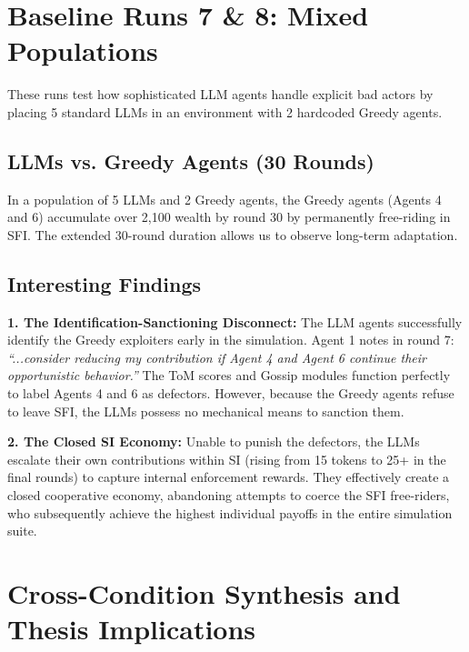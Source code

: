 \documentclass[11pt,a4paper]{article}
\begin{document}
\section{Baseline Runs 7 \& 8: Mixed Populations}

These runs test how sophisticated LLM agents handle explicit bad actors by placing 5 standard LLMs in an environment with 2 hardcoded Greedy agents.

\subsection{LLMs vs. Greedy Agents (30 Rounds)}
In a population of 5 LLMs and 2 Greedy agents, the Greedy agents (Agents 4 and 6) accumulate over 2,100 wealth by round 30 by permanently free-riding in SFI. The extended 30-round duration allows us to observe long-term adaptation.

\subsection{Interesting Findings}
\textbf{1. The Identification-Sanctioning Disconnect:}
The LLM agents successfully identify the Greedy exploiters early in the simulation. Agent 1 notes in round 7: \textit{``...consider reducing my contribution if Agent 4 and Agent 6 continue their opportunistic behavior.''} The ToM scores and Gossip modules function perfectly to label Agents 4 and 6 as defectors. However, because the Greedy agents refuse to leave SFI, the LLMs possess no mechanical means to sanction them. 

\textbf{2. The Closed SI Economy:}
Unable to punish the defectors, the LLMs escalate their own contributions within SI (rising from 15 tokens to 25+ in the final rounds) to capture internal enforcement rewards. They effectively create a closed cooperative economy, abandoning attempts to coerce the SFI free-riders, who subsequently achieve the highest individual payoffs in the entire simulation suite.

\section{Cross-Condition Synthesis and Thesis Implications}
\end{document}
